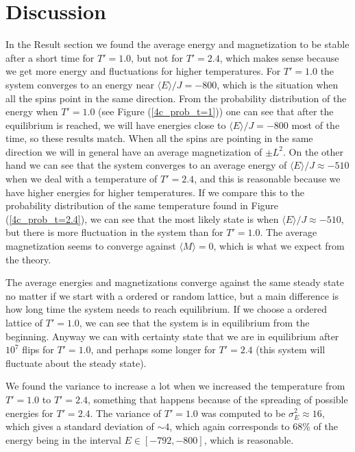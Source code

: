 \documentclass[norsk,a4paper,12pt]{article}
\begin{document}
\section{Discussion}
In the Result section we found the average energy and magnetization to be stable after a short time for $T'=1.0$, but not for $T'=2.4$, which makes sense because we get more energy and fluctuations for higher temperatures. For $T'=1.0$ the system converges to an energy near $\langle E\rangle/J=-800$, which is the situation when all the spins point in the same direction. From the probability distribution of the energy when $T'=1.0$ (see Figure (\ref{4c_prob_t=1})) one can see that after the equilibrium is reached, we will have energies close to $\langle E\rangle/J=-800$ most of the time, so these results match. When all the spins are pointing in the same direction we will in general have an average magnetization of $\pm L^2$. On the other hand we can see that the system converges to an average energy of $\langle E\rangle/J\approx-510$ when we deal with a temperature of $T'=2.4$, and this is reasonable because we have higher energies for higher temperatures. If we compare this to the probability distribution of the same temperature found in Figure (\ref{4c_prob_t=2.4}), we can see that the most likely state is when $\langle E\rangle/J\approx-510$, but there is more fluctuation in the system than for $T'=1.0$. The average magnetization seems to converge against $\langle M\rangle=0$, which is what we expect from the theory.\par\vspace{5mm}

The average energies and magnetizations converge against the same steady state no matter if we start with a ordered or random lattice, but a main difference is how long time the system needs to reach equilibrium. If we choose a ordered lattice of $T'=1.0$, we can see that the system is in equilibrium from the beginning. Anyway we can with certainty state that we are in equilibrium after $10^7$ flips for $T'=1.0$, and perhaps some longer for $T'=2.4$ (this system will fluctuate about the steady state).\par\vspace{5mm}

We found the variance to increase a lot when we increased the temperature from $T'=1.0$ to $T'=2.4$, something that happens because of the spreading of possible energies for $T'=2.4$. The variance of $T'=1.0$ was computed to be $\sigma_E^2\approx16$, which gives a standard deviation of $\sim 4$, which again corresponds to $68\%$ of the energy being in the interval $E\in[-792,-800]$, which is reasonable. \par\vspace{5mm}
\end{document}
